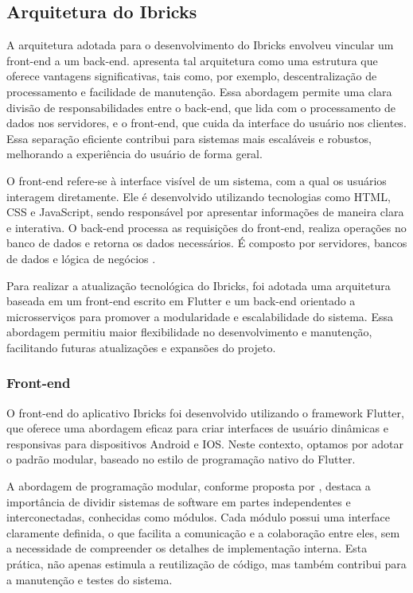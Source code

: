 \documentclass[12pt]{article}
\begin{document}
\subsection{Arquitetura do Ibricks}

A arquitetura adotada para o desenvolvimento do Ibricks envolveu vincular um front-end a um back-end. \cite{renaud1994introducao} apresenta tal arquitetura como uma estrutura que oferece vantagens significativas, tais como, por exemplo, descentralização de processamento e facilidade de manutenção. Essa abordagem permite uma clara divisão de responsabilidades entre o back-end, que lida com o processamento de dados nos servidores, e o front-end, que cuida da interface do usuário nos clientes. Essa separação eficiente contribui para sistemas mais escaláveis e robustos, melhorando a experiência do usuário de forma geral.

O front-end refere-se à interface visível de um sistema, com a qual os usuários interagem diretamente. Ele é desenvolvido utilizando tecnologias como HTML, CSS e JavaScript, sendo responsável por apresentar informações de maneira clara e interativa. O back-end processa as requisições do front-end, realiza operações no banco de dados e retorna os dados necessários. É composto por servidores, bancos de dados e lógica de negócios \cite{bass2012software}.

Para realizar a atualização tecnológica do Ibricks, foi adotada uma arquitetura baseada em um front-end escrito em Flutter e um back-end orientado a microsserviços para promover a modularidade e escalabilidade do sistema. Essa abordagem permitiu maior flexibilidade no desenvolvimento e manutenção, facilitando futuras atualizações e expansões do projeto.

\subsubsection{Front-end}

O front-end do aplicativo Ibricks foi desenvolvido utilizando o framework Flutter, que oferece uma abordagem eficaz para criar interfaces de usuário dinâmicas e responsivas para dispositivos Android e IOS. Neste contexto, optamos por adotar o padrão modular, baseado no estilo de programação nativo do Flutter.

A abordagem de programação modular, conforme proposta por \cite{meyer1997object}, destaca a importância de dividir sistemas de software em partes independentes e interconectadas, conhecidas como módulos. Cada módulo possui uma interface claramente definida, o que facilita a comunicação e a colaboração entre eles, sem a necessidade de compreender os detalhes de implementação interna. Esta prática, não apenas estimula a reutilização de código, mas também contribui para a manutenção e testes do sistema.
\end{document}
